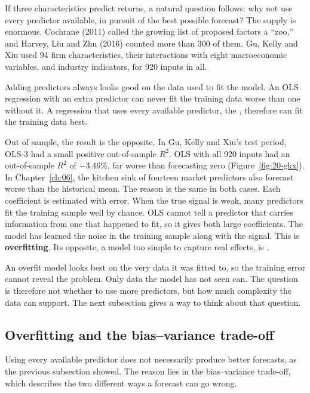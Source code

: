 If three characteristics predict returns, a natural question follows: why not use every predictor available, in pursuit of the best possible forecast? The supply is enormous. 
Cochrane (2011) called the growing list of proposed factors a ``zoo,'' and Harvey, Liu and Zhu (2016) counted more than 300 of them.
Gu, Kelly and Xiu used 94 firm characteristics, their interactions with eight macroeconomic variables, and industry indicators, for 920 inputs in all.

Adding predictors always looks good on the data used to fit the model. An OLS regression with an extra predictor can never fit the training data worse than one without it. A regression that uses every available predictor, the , therefore can fit the training data best.

Out of sample, the result is the opposite. In Gu, Kelly and Xiu's test period, OLS-3 had a small positive out-of-sample $R^2$. OLS with all 920 inputs had an out-of-sample $R^2$ of $-3.46\%$, far worse than forecasting zero (Figure~\ref{fig:20-gkx}). In Chapter~\ref{ch:06}, the kitchen sink of fourteen market predictors also forecast worse than the historical mean. The reason is the same in both cases. Each coefficient is estimated with error. When the true signal is weak, many predictors fit the training sample well by chance. OLS cannot tell a predictor that carries information from one that happened to fit, so it gives both large coefficients. The model has learned the noise in the training sample along with the signal. This is \textbf{overfitting}. Its opposite, a model too simple to capture real effects, is .

An overfit model looks best on the very data it was fitted to, so the training error cannot reveal the problem. Only data the model has not seen can. The question is therefore not whether to use more predictors, but how much complexity the data can support. The next subsection gives a way to think about that question.

\subsection{Overfitting and the bias--variance trade-off}
\label{sec:20-biasvar}

Using every available predictor does not necessarily produce better forecasts, as the previous subsection showed. The reason lies in the bias--variance trade-off, which describes the two different ways a forecast can go wrong.

